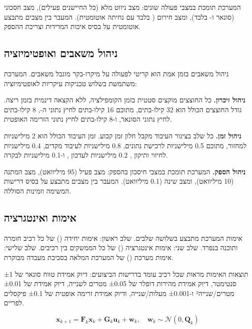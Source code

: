 המערכת תומכת במצבי פעולה שונים: מצב ניווט מלא (כל החיישנים פעילים), מצב חסכוני (סונאר ו- בלבד), ומצב חירום ( בלבד עם נחיתה אוטומטית). המעבר בין מצבים מתבצע אוטומטית על בסיס איכות המדידות וצריכת ההספק.

\subsection{ניהול משאבים ואופטימיזציה}
\label{sec:ch07_resource_management}

ניהול משאבים בזמן אמת הוא קריטי לפעולה על מיקרו-בקר מוגבל משאבים. המערכת משתמשת בשלוש טכניקות עיקריות לאופטימיזציה:

\textbf{ניהול זיכרון.} כל החוצצים מוקצים סטטית בזמן הקומפילציה, ללא הקצאה דינמית בזמן ריצה. גודל החוצצים הכולל הוא 32 קילו-בתים, מתוכם 16 קילו-בתים לחיץ נתוני ה-, 8 קילו-בתים לחיץ נתוני הסונאר, ו-8 קילו-בתים לחיץ נתוני הזרימה האופטית.

\textbf{ניהול זמן.} כל שלב בצינור העיבוד מקבל חלון זמן קבוע. זמן העיבוד הכולל הוא 2 מילישניות למחזור, מתוכם 0.5 מילישניות לרכישת נתונים, 0.8 מילישניות לעיבוד מקדים, 0.4 מילישניות לחיזוי ותיקון , 0.2 מילישניות לעדכון , ו-0.1 מילישניות לבקרה.

\textbf{ניהול הספק.} המערכת תומכת במצבי חיסכון בהספק: מצב פעיל (95 מיליוואט), מצב המתנה (10 מיליוואט), ומצב שינה (0.1 מיליוואט). המעבר בין מצבים מתבצע על בסיס דרישות המשימה וזמינות הסוללה.

\subsection{אימות ואינטגרציה}
\label{sec:ch07_verification}

אימות המערכת מתבצע בשלושה שלבים. שלב ראשון: אימות יחידה () של כל רכיב חומרה ותוכנה בנפרד. שלב שני: אימות אינטגרציה () של כל הממשקים בין רכיבים. שלב שלישי: אימות מערכת () של המערכת המלאה בסביבת מעבדה מבוקרת.

תוצאות האימות מראות שכל רכיב עומד בדרישות הביצועים: דיוק אמידת טווח סונאר של ±1 סנטימטר, דיוק אמידת מהירות דופלר של ±0.05 מטרים לשנייה, דיוק אמידת  של ±0.01 מטרים/שנייה² ו-±0.001 מעלות/שנייה, ודיוק אמידת זרימה אופטית של ±0.1 פיקסלים לפריים.

\begin{equation}
\mathbf{x}_{k+1} = \mathbf{F}_k \mathbf{x}_k + \mathbf{G}_k \mathbf{u}_k + \mathbf{w}_k, \quad \mathbf{w}_k \sim \mathcal{N}(0, \mathbf{Q}_k)
\label{eq:ch07_state_space}
\end{equation}

